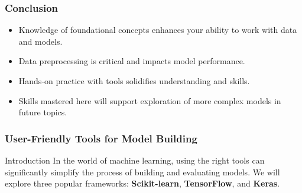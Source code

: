 \documentclass[aspectratio=169]{beamer}
\begin{document}
\begin{frame}[fragile]
    \frametitle{Conclusion}
    \begin{itemize}
        \item Knowledge of foundational concepts enhances your ability to work with data and models.
        \item Data preprocessing is critical and impacts model performance.
        \item Hands-on practice with tools solidifies understanding and skills.
        \item Skills mastered here will support exploration of more complex models in future topics.
    \end{itemize}
\end{frame}

\begin{frame}[fragile]
  \frametitle{User-Friendly Tools for Model Building}
  \begin{block}{Introduction}
  In the world of machine learning, using the right tools can significantly simplify the process of building and evaluating models. 
  We will explore three popular frameworks: \textbf{Scikit-learn}, \textbf{TensorFlow}, and \textbf{Keras}.
  \end{block}
\end{frame}
\end{document}
